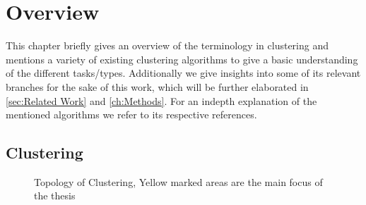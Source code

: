 \chapter{Overview}

This chapter briefly gives an overview of the terminology in clustering and mentions a variety of existing clustering algorithms to give a basic understanding of the different tasks/types. Additionally we give insights into some of its relevant branches for the sake of this work, which will be further elaborated in \autoref{sec:Related Work} and \autoref{ch:Methods}. For an indepth explanation of the mentioned algorithms we refer to its respective references.

\section{Clustering}\label{sec:clu}
\cite{kriegel2009clustering}

\begin{figure}
    \centering
    \caption{Topology of Clustering, Yellow marked areas are the main focus of the thesis}
    \label{fig:my_label}
\end{figure}

